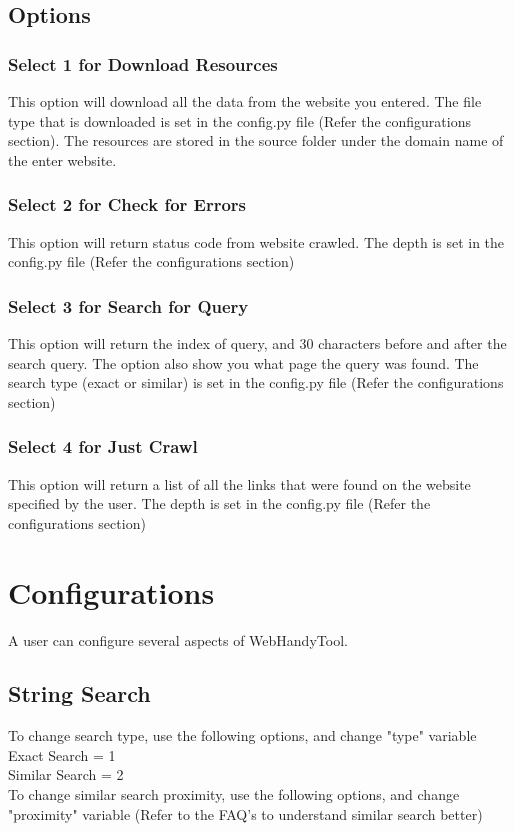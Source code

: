 \documentclass[12pt, titlepage]{article}
\begin{document}
\subsection{Options}
\subsubsection{Select 1 for Download Resources }
This option will download all the data from the website you entered. The file type that is downloaded is set in the config.py file (Refer the configurations section). The resources are stored in the source folder under the domain name of the enter website.\\
\subsubsection{Select 2 for Check for Errors}
This option will return status code from website crawled. The depth is set in the config.py file (Refer the configurations section)\\
\subsubsection{Select 3 for Search for Query}
This option will return the index of query, and 30 characters before and after the search query. The option also show you what page the query was found. The search type (exact or similar)  is set in the config.py file (Refer the configurations section)\\
\subsubsection{Select 4 for Just Crawl }
This option will return a list of all the links that were found on the website specified by the user.  The depth is set in the config.py file (Refer the configurations section)\\

\pagebreak

\section{Configurations}
A user can configure several aspects of WebHandyTool.
\subsection{String Search} 
To change search type, use the following options, and change "type" variable \\
Exact Search = 1\\
Similar Search = 2\\
To change similar search proximity, use the following options, and change "proximity" variable (Refer to the FAQ's to understand similar search better)\\
\end{document}
